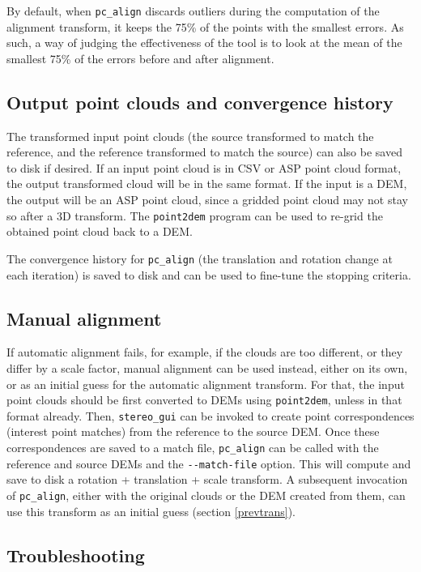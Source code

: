 By default, when \texttt{pc\_align} discards outliers during the
computation of the alignment transform, it keeps the 75\% of the points
with the smallest errors. As such, a way of judging the effectiveness of
the tool is to look at the mean of the smallest 75\% of the errors
before and after alignment.

\subsection{Output point clouds and convergence history}

The transformed input point clouds (the source transformed to match the
reference, and the reference transformed to match the source) can also
be saved to disk if desired. If an input point cloud is in CSV or ASP
point cloud format, the output transformed cloud will be in the same
format. If the input is a DEM, the output will be an ASP point cloud,
since a gridded point cloud may not stay so after a 3D transform. The
\texttt{point2dem} program can be used to re-grid the obtained point
cloud back to a DEM.

The convergence history for \texttt{pc\_align} (the translation and
rotation change at each iteration) is saved to disk and can be used to
fine-tune the stopping criteria.

\subsection{Manual alignment}

If automatic alignment fails, for example, if the clouds are too
different, or they differ by a scale factor, manual alignment can be
used instead, either on its own, or as an initial guess for the
automatic alignment transform. For that, the input point clouds should
be first converted to DEMs using \texttt{point2dem}, unless in that
format already. Then, \texttt{stereo\_gui} can be invoked to create
point correspondences (interest point matches) from the reference to the
source DEM. Once these correspondences are saved to a match file,
\texttt{pc\_align} can be called with the reference and source DEMs and
the \texttt{-\/-match-file} option.  This will compute and save to disk
a rotation + translation + scale transform.  A subsequent invocation of
\texttt{pc\_align}, either with the original clouds or the DEM created
from them, can use this transform as an initial guess (section
\ref{prevtrans}).

\subsection{Troubleshooting}

